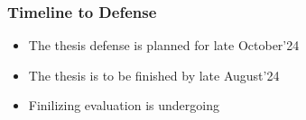 \documentclass[xcolor={dvipsnames}, aspectratio=169]{beamer}
\begin{document}
\begin{frame}[fragile]
  \frametitle{Timeline to Defense}

\begin{itemize}
  \item The thesis defense is planned for late October'24
  \item The thesis is to be finished by late August'24
  \item Finilizing evaluation is undergoing
\end{itemize}
\end{frame}
\end{document}

